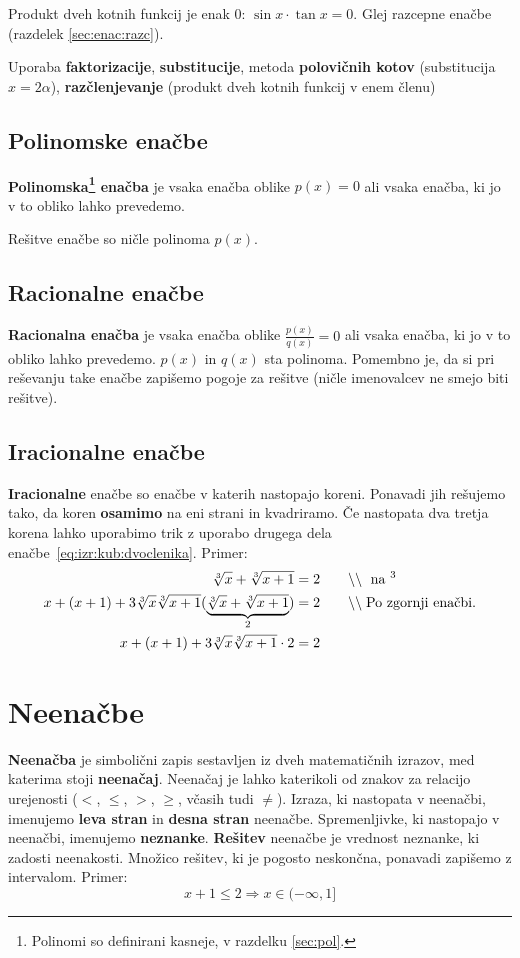\documentclass[a4paper,oneside,12pt,fleqn]{article}
\makeatletter
\newcommand\krat\cdot
\newcommand{\comment}[1]{\ensuremath{\qquad\backslash\backslash\;}\textnormal{#1}}
\newcommand{\hyperanchor}[1]{\Hy@raisedlink{\hypertarget{#1}{}}}
\renewcommand\implies\Rightarrow
\numberwithin{equation}{section}
\makeatother
\begin{document}
Produkt dveh kotnih funkcij je enak 0: $\sin x \krat \tan x = 0$. Glej razcepne enačbe
(razdelek \ref{sec:enac:razc}).

Uporaba \textbf{faktorizacije}, \textbf{substitucije}, metoda \textbf{polovičnih kotov} (substitucija $x = 2\alpha$),
\textbf{razčlenjevanje} (produkt dveh kotnih funkcij v enem členu)

\subsection{Polinomske enačbe}
\label{sec:enac:pol}
\textbf{Polinomska\footnote{Polinomi so definirani kasneje, v razdelku \ref{sec:pol}.}
enačba} je vsaka enačba oblike $p(x) = 0$ ali vsaka enačba, ki jo v to obliko lahko prevedemo. 

Rešitve enačbe so ničle polinoma $p(x)$.

\subsection{Racionalne enačbe}
\label{sec:enac:rac}
\textbf{Racionalna enačba} je vsaka enačba oblike $\frac{p(x)}{q(x)} = 0$ ali vsaka enačba, ki jo
v to obliko lahko prevedemo. $p(x)$ in $q(x)$ sta polinoma.
Pomembno je, da si pri reševanju take enačbe zapišemo pogoje
za rešitve (ničle imenovalcev ne smejo biti rešitve).

\subsection{Iracionalne enačbe}
\textbf{Iracionalne} enačbe so enačbe v katerih nastopajo koreni. Ponavadi jih rešujemo
tako, da koren \textbf{osamimo} na eni strani in kvadriramo. Če nastopata dva tretja korena lahko
uporabimo trik z uporabo drugega dela enačbe~\ref{eq:izr:kub:dvoclenika}. Primer:
\begin{align*}
  \sqrt[3]{x} + \sqrt[3]{x+1} &= 2  \comment{ na $^3$} \\
  x + (x+1) + 3\sqrt[3]{x}\sqrt[3]{x+1}(\underbrace{\sqrt[3]{x} + \sqrt[3]{x+1}}_{2}) &=  2
  \comment{Po zgornji enačbi.} \\
  x + (x+1) + 3\sqrt[3]{x}\sqrt[3]{x+1} \krat 2 &= 2
\end{align*}


\section{Neenačbe}
\label{sec:neenac}
\textbf{Neenačba} je simbolični zapis sestavljen iz dveh matematičnih
izrazov, med katerima stoji \textbf{neenačaj}. \hyperanchor{point:neenacaj}
Neenačaj je lahko katerikoli od znakov za relacijo
urejenosti ($<$, $\leq$, $>$, $\geq$, včasih tudi $\neq$). Izraza, ki nastopata v neenačbi,
imenujemo \textbf{leva stran} in \textbf{desna stran} neenačbe.
Spremenljivke, ki nastopajo v neenačbi, imenujemo \textbf{neznanke}.
\textbf{Rešitev} neenačbe je vrednost neznanke, ki zadosti neenakosti. 
Množico rešitev, ki je pogosto neskončna, ponavadi zapišemo z intervalom.
Primer:
\[ x + 1 \leq 2 \implies x \in (-\infty, 1] \]
\end{document}
